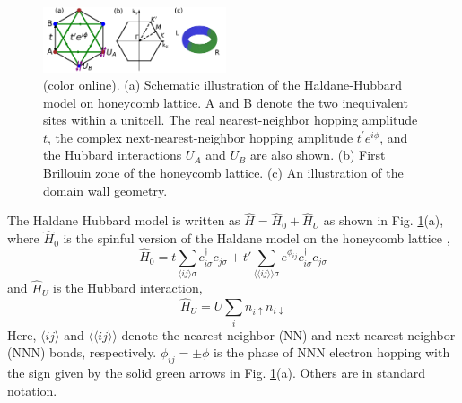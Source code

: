 \documentclass[amsmath,superscriptaddress,showpacs,aps,prl,twocolumn]{revtex4-1}
\begin{document}
\begin{figure}
\centering
\includegraphics[width=0.48\textwidth]{lattice}
\caption{(color online). (a) Schematic illustration of the Haldane-Hubbard model on honeycomb lattice. A and B denote the two inequivalent sites within a unitcell. The real nearest-neighbor hopping amplitude $t$, the complex next-nearest-neighbor hopping amplitude $t^\prime e^{i\phi}$, and the Hubbard interactions $U_A$ and $U_B$ are also shown. (b) First Brillouin zone of the honeycomb lattice. (c) An illustration of the domain wall geometry.}
\label{lattice}
\end{figure}

\par The Haldane Hubbard model is written as $\hat{H}=\hat{H}_0+\hat{H}_U$ as shown in Fig. \ref{lattice}(a), where $\hat{H}_0$ is the spinful version of the Haldane model on the honeycomb lattice \cite{Haldane_PRL1988},
\begin{equation}\label{H0}
\hat{H}_0=t\sum_{\langle ij\rangle\sigma}c^{\dagger}_{i\sigma}c_{j\sigma}+t'\sum_{\langle\langle ij\rangle\rangle\sigma}e^{\phi_{ij}}c^{\dagger}_{i\sigma}c_{j\sigma}
\end{equation}
and $\hat{H}_U$ is the Hubbard interaction,
\begin{equation}\label{HU}
\hat{H}_U=U\sum_i n_{i\uparrow}n_{i\downarrow}
\end{equation}
Here, $\langle ij\rangle$ and $\langle\langle ij\rangle\rangle$ denote the nearest-neighbor (NN) and next-nearest-neighbor (NNN) bonds, respectively. $\phi_{ij}=\pm\phi$ is the phase of NNN electron hopping with the sign given by the solid green arrows in Fig. \ref{lattice}(a). Others are in standard notation.
\end{document}
